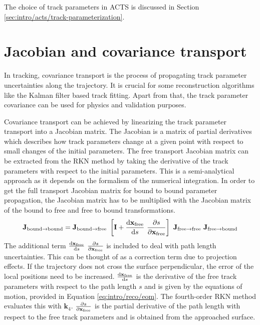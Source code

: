 The choice of track parameters in ACTS is discussed in Section \ref{sec:intro/acts/track-parameterization}.

\section{Jacobian and covariance transport}
\label{sec:intro/reco/jac-transport}

In tracking, covariance transport is the process of propagating track parameter uncertainties along the trajectory. It is crucial for some reconstruction algorithms like the Kalman filter based track fitting. Apart from that, the track parameter covariance can be used for physics and validation purposes.

Covariance transport can be achieved by linearizing the track parameter transport into a Jacobian matrix. The Jacobian is a matrix of partial derivatives which describes how track parameters change at a given point with respect to small changes of the initial parameters. The free transport Jacobian matrix can be extracted from the RKN method by taking the derivative of the track parameters with respect to the initial parameters. This is a semi-analytical approach as it depends on the formalism of the numerical integration. In order to get the full transport Jacobian matrix for bound to bound parameter propagation, the Jacobian matrix has to be multiplied with the Jacobian matrix of the bound to free and free to bound transformations.
\begin{equation}
    \mathbf{J}_\text{bound\textrightarrow bound} = \mathbf{J}_\text{bound\textrightarrow free} \ \left[ \mathbf{I} + \dv{\mathbf{x}_\text{free}}{s} \ \pdv{s}{\mathbf{x}_\text{free}} \right] \ \mathbf{J}_\text{free\textrightarrow free} \ \mathbf{J}_\text{free\textrightarrow bound}
\end{equation}
The additional term $\dv{\mathbf{x}_\text{free}}{s} \ \pdv{s}{\mathbf{x}_\text{free}}$ is included to deal with path length uncertainties. This can be thought of as a correction term due to projection effects. If the trajectory does not cross the surface perpendicular, the error of the local positions need to be increased. $\dv{\mathbf{x}_\text{free}}{s}$ is the derivative of the free track parameters with respect to the path length $s$ and is given by the equations of motion, provided in Equation \ref{eq:intro/reco/eom}. The fourth-order RKN method evaluates this with $\mathbf{k}_4$. $\pdv{s}{\mathbf{x}_\text{free}}$ is the partial derivative of the path length with respect to the free track parameters and is obtained from the approached surface.

